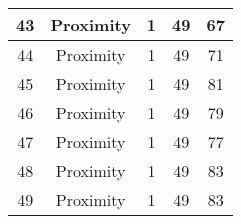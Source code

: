 \documentclass[results.tex]{subfiles}
\begin{document}
\begin{center}
\begin{tabular}{| c || c | c | c | c |}
            \hline
            43                      & Proximity                    & 1                      & 49                      & 67                   \\
            \hline
            44                      & Proximity                    & 1                      & 49                      & 71                   \\
            \hline
            45                      & Proximity                    & 1                      & 49                      & 81                   \\
            \hline
            46                      & Proximity                    & 1                      & 49                      & 79                   \\
            \hline
            47                      & Proximity                    & 1                      & 49                      & 77                   \\
            \hline
            48                      & Proximity                    & 1                      & 49                      & 83                   \\
            \hline
            49                      & Proximity                    & 1                      & 49                      & 83                   \\
            \hline
        \end{tabular}
    \end{center}
\end{document}
